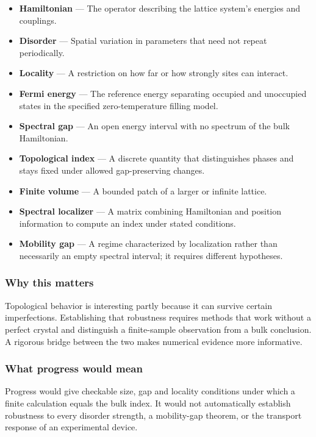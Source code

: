 \documentclass[
  11pt,
]{article}
\begin{document}
\begin{itemize}
\item
  \textbf{Hamiltonian} --- The operator describing the lattice system's
  energies and couplings.
\item
  \textbf{Disorder} --- Spatial variation in parameters that need not
  repeat periodically.
\item
  \textbf{Locality} --- A restriction on how far or how strongly sites
  can interact.
\item
  \textbf{Fermi energy} --- The reference energy separating occupied and
  unoccupied states in the specified zero-temperature filling model.
\item
  \textbf{Spectral gap} --- An open energy interval with no spectrum of
  the bulk Hamiltonian.
\item
  \textbf{Topological index} --- A discrete quantity that distinguishes
  phases and stays fixed under allowed gap-preserving changes.
\item
  \textbf{Finite volume} --- A bounded patch of a larger or infinite
  lattice.
\item
  \textbf{Spectral localizer} --- A matrix combining Hamiltonian and
  position information to compute an index under stated conditions.
\item
  \textbf{Mobility gap} --- A regime characterized by localization
  rather than necessarily an empty spectral interval; it requires
  different hypotheses.
\end{itemize}

\subsubsection{Why this matters}

Topological behavior is interesting partly because it can survive
certain imperfections. Establishing that robustness requires methods
that work without a perfect crystal and distinguish a finite-sample
observation from a bulk conclusion. A rigorous bridge between the two
makes numerical evidence more informative.

\subsubsection{What progress would mean}

Progress would give checkable size, gap and locality conditions under
which a finite calculation equals the bulk index. It would not
automatically establish robustness to every disorder strength, a
mobility-gap theorem, or the transport response of an experimental
device.
\end{document}
